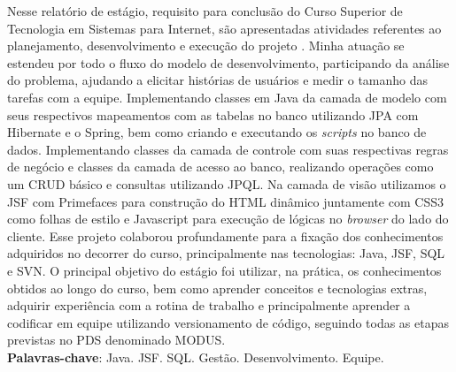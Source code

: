 
\begin{resumo}[RESUMO]
\begin{SingleSpacing}



Nesse relatório de estágio, requisito para conclusão do Curso Superior de Tecnologia em Sistemas para Internet, são apresentadas atividades referentes ao planejamento, desenvolvimento e execução do projeto \imprimirtitulo. Minha atuação se estendeu por todo o fluxo do modelo de desenvolvimento, participando da análise do problema, ajudando a elicitar histórias de usuários e medir o tamanho das tarefas com a equipe. Implementando classes em Java da camada de modelo com seus respectivos mapeamentos com as tabelas no banco utilizando JPA com Hibernate e o Spring, bem como criando e executando os \textit{scripts} no banco de dados. Implementando classes da camada de controle com suas respectivas regras de negócio e classes da camada de acesso ao banco, realizando operações como um CRUD básico e consultas utilizando JPQL. Na camada de visão utilizamos o JSF com Primefaces para construção do HTML dinâmico juntamente com CSS3 como folhas de estilo e Javascript para execução de lógicas no \textit{browser} do lado do cliente. Esse projeto colaborou profundamente para a fixação dos conhecimentos adquiridos no decorrer do curso, principalmente nas tecnologias: Java, JSF, SQL e SVN. O principal objetivo do estágio foi utilizar, na prática, os conhecimentos obtidos ao longo do curso, bem como aprender conceitos e tecnologias extras, adquirir experiência com a rotina de trabalho e principalmente aprender a codificar em equipe utilizando versionamento de código, seguindo todas as etapas previstas no PDS denominado MODUS. \\

\textbf{Palavras-chave}: Java. JSF. SQL. Gestão. Desenvolvimento. Equipe.

\end{SingleSpacing}
\end{resumo}

